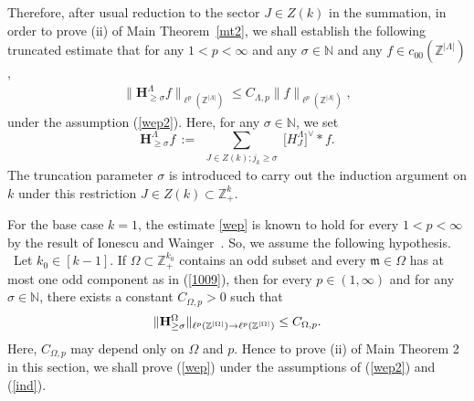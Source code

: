 \documentclass[11 pt,letterpaper]{amsart}
\theoremstyle{plain}
\theoremstyle{definition}
\theoremstyle{remark} \theoremstyle{exam} \theoremstyle{ob}
\numberwithin{equation}{section}
\begin{document}
Therefore, after usual reduction to the sector \(J\in Z(k)\) in the summation, in order to prove (ii) of Main Theorem~\ref{mt2},
we shall establish the following truncated estimate  that for any $1<p<\infty$ and any $\sigma\in\mathbb{N}$ and any  $f\in c_{00}(\mathbb{Z}^{|\Lambda|})$,  
\begin{align}\label{wep}
	\|\mathbf{H}_{\ge \sigma}^{\Lambda} f\|_{\ell^p(\mathbb{Z}^{|\Lambda|})}
	\leq
	C_{\Lambda,p}
	\|f\|_{\ell^p(\mathbb{Z}^{|\Lambda|})},
\end{align} 
under the assumption (\ref{wep2}).  Here,  for any $\sigma\in\mathbb{N}$, we set \[
\mathbf{H}_{\ge \sigma}^{\Lambda} f
\,:=\,
\sum_{\substack{J\in Z(k); j_k\ge \sigma}}
\bigl[ H_J^{\Lambda} \bigr]^{\vee} * f.
\]
The truncation parameter $\sigma$  is introduced to carry out the induction argument on $k$ under this restriction $J\in Z(k)\subset \mathbb Z_+^k$.

For the base case $k=1$, the estimate \eqref{wep} is known to hold for every $1<p<\infty$ by the result of Ionescu and Wainger~\cite{IW}.
 So, we assume the following hypothesis.
\\

\    Let $k_0\in[k-1].$ If  $\Omega \subset \mathbb{Z}_+^{k_0}$ contains an odd subset and 
 every $\mathfrak{m} \in \Omega$ has at most one odd component as in (\ref{1009}),  then for every $p \in (1,\infty)$ and for any $\sigma\in\mathbb{N}$, 
there exists a constant $C_{\Omega,p} > 0$ such that
\begin{align}\label{ind}
	\| {\bf H}_{\ge \sigma}^{\Omega} \|_{\ell^p(\mathbb{Z}^{|\Omega|}) \to \ell^p(\mathbb{Z}^{|\Omega|})}
	\le C_{\Omega,p}.
\end{align}
Here, $C_{\Omega,p}$ may depend only on $\Omega$ and $p$. Hence to prove (ii) of Main Theorem 2 in this section, we shall prove (\ref{wep}) under the assumptions of   (\ref{wep2}) and  (\ref{ind}).


 
 
\end{document}
